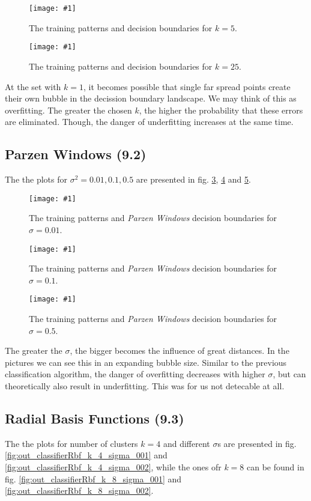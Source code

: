 \documentclass[a4paper,headings=small]{scrartcl}
\newcommand{\image}[3]{
\begin{figure}[htbp]
\centering
\texttt{[image: \#1]}
\caption{#3}
\label{fig:#1}
\end{figure}
}
\begin{document}
\image{out_classifierKnn_k_5}{\classifierPlotWidth}%
	{The training patterns and decision boundaries for $k = 5$.}

\image{out_classifierKnn_k_25}{\classifierPlotWidth}%
	{The training patterns and decision boundaries for $k = 25$.}

At the set with $k = 1$, it becomes possible that single far spread points
create their own bubble in the decission boundary landscape.
We may think of this as overfitting.
The greater the chosen $k$, the higher the probability that these errors are eliminated.
Though, the danger of underfitting increases at the same time.


\subsection{Parzen Windows (9.2)}
The the plots for $\sigma^2 = 0.01, 0.1, 0.5$ are presented in fig.
\ref{fig:out_classifierParzen_sigma2_001},
\ref{fig:out_classifierParzen_sigma2_01} and
\ref{fig:out_classifierParzen_sigma2_05}.

\image{out_classifierParzen_sigma2_001}{\classifierPlotWidth}%
	{The training patterns and \emph{Parzen Windows} decision boundaries for $\sigma = 0.01$.}

\image{out_classifierParzen_sigma2_01}{\classifierPlotWidth}%
	{The training patterns and \emph{Parzen Windows} decision boundaries for $\sigma = 0.1$.}

\image{out_classifierParzen_sigma2_05}{\classifierPlotWidth}%
	{The training patterns and \emph{Parzen Windows} decision boundaries for $\sigma = 0.5$.}

The greater the $\sigma$, the bigger becomes the influence of great distances.
In the pictures we can see this in an expanding bubble size.
Similar to the previous classification algorithm, the danger of overfitting decreases with higher $\sigma$,
but can theoretically also result in underfitting.
This was for us not detecable at all.


\subsection{Radial Basis Functions (9.3)}
The the plots for number of clusters $k = 4$ and different $\sigma$s are presented in fig.
\ref{fig:out_classifierRbf_k_4_sigma_001} and
\ref{fig:out_classifierRbf_k_4_sigma_002},
while the ones ofr $k = 8$ can be found in fig.
\ref{fig:out_classifierRbf_k_8_sigma_001} and
\ref{fig:out_classifierRbf_k_8_sigma_002}.
\end{document}
